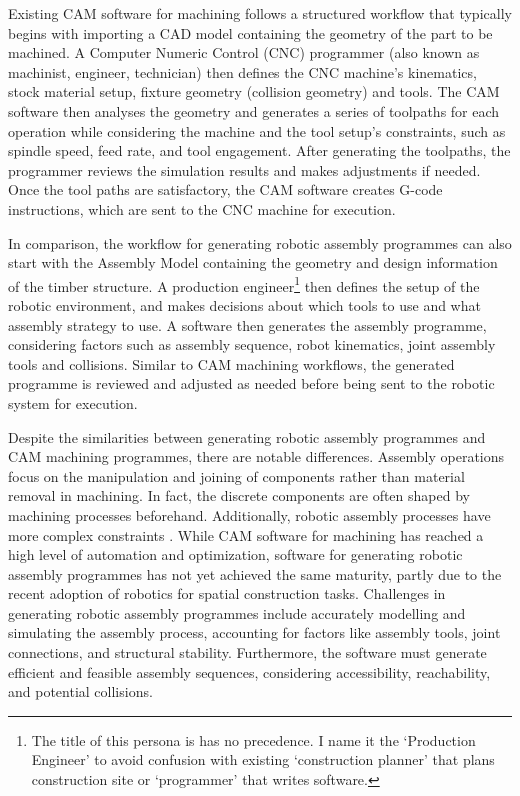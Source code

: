 Existing CAM software for machining follows a structured workflow that typically begins with importing a CAD model containing the geometry of the part to be machined. A Computer Numeric Control (CNC) programmer (also known as machinist, engineer, technician) then defines the CNC machine’s kinematics, stock material setup, fixture geometry (collision geometry) and tools. The CAM software then analyses the geometry and generates a series of toolpaths for each operation while considering the machine and the tool setup's constraints, such as spindle speed, feed rate, and tool engagement. After generating the toolpaths, the programmer reviews the simulation results and makes adjustments if needed. Once the tool paths are satisfactory, the CAM software creates G-code instructions, which are sent to the CNC machine for execution.

In comparison, the workflow for generating robotic assembly programmes can also start with the Assembly Model  containing the geometry and design information of the timber structure. A production engineer\footnote{ The title of this persona is has no precedence. I name it the ‘Production Engineer’ to avoid confusion with existing ‘construction planner’ that plans construction site or ‘programmer’ that writes software.} then defines the setup of the robotic environment, and makes decisions about which tools to use and what assembly strategy to use. A software then generates the assembly programme, considering factors such as assembly sequence, robot kinematics, joint assembly tools and collisions. Similar to CAM machining workflows, the generated programme is reviewed and adjusted as needed before being sent to the robotic system for execution.

Despite the similarities between generating robotic assembly programmes and CAM machining programmes, there are notable differences. Assembly operations focus on the manipulation and joining of components rather than material removal in machining. In fact, the discrete components are often shaped by machining processes beforehand. Additionally, robotic assembly processes have more complex constraints \parencite{wangStateArtComputational2021}. While CAM software for machining has reached a high level of automation and optimization, software for generating robotic assembly programmes has not yet achieved the same maturity, partly due to the recent adoption of robotics for spatial construction tasks. Challenges in generating robotic assembly programmes include accurately modelling and simulating the assembly process, accounting for factors like assembly tools, joint connections, and structural stability. Furthermore, the software must generate efficient and feasible assembly sequences, considering accessibility, reachability, and potential collisions.

